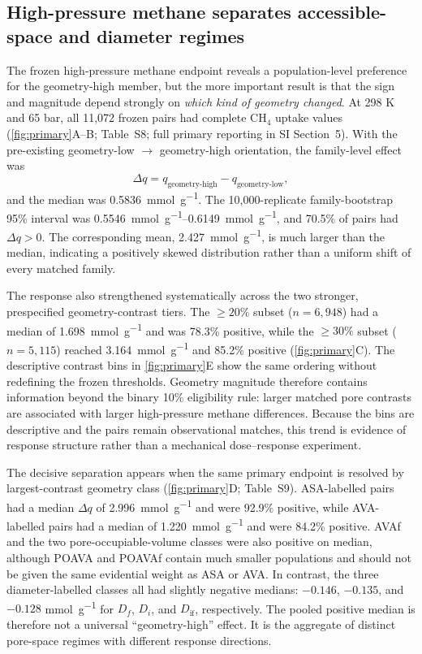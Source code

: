 \documentclass[11pt,a4paper]{article}
\newcommand{\SItab}[1]{Table~S#1}
\newcommand{\SIsec}[1]{SI Section~#1}
\begin{document}
\subsection{High-pressure methane separates accessible-space and diameter regimes}

The frozen high-pressure methane endpoint reveals a population-level preference for
the geometry-high member, but the more important result is that the sign and
magnitude depend strongly on \emph{which kind of geometry changed}. At 298 K and
65 bar, all 11,072 frozen pairs had complete CH$_4$ uptake values
(\cref{fig:primary}A--B; \SItab{8}; full primary reporting in \SIsec{5}). With the pre-existing geometry-low
$\rightarrow$ geometry-high orientation, the family-level effect was
\[
\Delta q =
q_{\mathrm{geometry\mbox{-}high}}-
q_{\mathrm{geometry\mbox{-}low}},
\]
and the median was \SI{0.5836}{\milli\mole\per\gram}. The
10,000-replicate family-bootstrap 95\% interval was
\SIrange{0.5546}{0.6149}{\milli\mole\per\gram}, and 70.5\% of pairs had
$\Delta q>0$. The corresponding mean,
\SI{2.427}{\milli\mole\per\gram}, is much larger than the median, indicating a
positively skewed distribution rather than a uniform shift of every matched family.

The response also strengthened systematically across the two stronger,
prespecified geometry-contrast tiers. The $\geq20\%$ subset
($n=6,948$) had a median of
\SI{1.698}{\milli\mole\per\gram} and was 78.3\% positive, while the
$\geq30\%$ subset ($n=5,115$) reached
\SI{3.164}{\milli\mole\per\gram} and 85.2\% positive
(\cref{fig:primary}C). The descriptive contrast bins in
\cref{fig:primary}E show the same ordering without redefining the frozen
thresholds. Geometry magnitude therefore contains information beyond the binary
10\% eligibility rule: larger matched pore contrasts are associated with larger
high-pressure methane differences. Because the bins are descriptive and the pairs
remain observational matches, this trend is evidence of response structure rather
than a mechanical dose--response experiment.

The decisive separation appears when the same primary endpoint is resolved by
largest-contrast geometry class (\cref{fig:primary}D; \SItab{9}). ASA-labelled
pairs had a median $\Delta q$ of
\SI{2.996}{\milli\mole\per\gram} and were 92.9\% positive, while AVA-labelled
pairs had a median of \SI{1.220}{\milli\mole\per\gram} and were 84.2\%
positive. AVAf and the two pore-occupiable-volume classes were also positive on
median, although POAVA and POAVAf contain much smaller populations and should not
be given the same evidential weight as ASA or AVA. In contrast, the three
diameter-labelled classes all had slightly negative medians:
$-0.146$, $-0.135$, and $-0.128$
\si{\milli\mole\per\gram} for $D_f$, $D_i$, and $D_{\mathrm{if}}$,
respectively. The pooled positive median is therefore not a universal
``geometry-high'' effect. It is the aggregate of distinct pore-space regimes with
different response directions.
\end{document}
